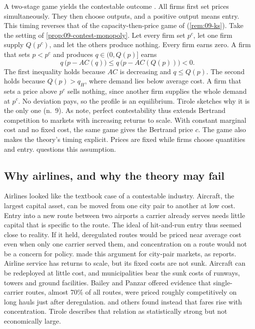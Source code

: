 \begin{remark}\label{rem:09-bertrand}
A two-stage game yields the contestable outcome \citep[sec.~8.1.2]{Tirole1988}. All firms first set prices
simultaneously. They then choose outputs, and a positive output means entry. This timing reverses that of
the capacity-then-price game of \citet{KrepsScheinkman1983} (\cref{rem:09-ks}). Take the setting of
\cref{prop:09-contest-monopoly}. Let every firm set $p^c$, let one firm supply $Q(p^c)$, and let the others
produce nothing. Every firm earns zero. A firm that sets $p < p^c$ and produces $q \in (0, Q(p)]$ earns
\begin{equation*}
  q\,\big(p - AC(q)\big) \le q\,\big(p - AC(Q(p))\big) < 0 .
\end{equation*}
The first inequality holds because $AC$ is decreasing and $q \le Q(p)$. The second holds because
$Q(p) > q_H$, where demand lies below average cost. A firm that sets a price above $p^c$ sells nothing, since
another firm supplies the whole demand at $p^c$. No deviation pays, so the profile is an equilibrium. Tirole
sketches why it is the only one (n.~9). As \citeauthor{BaumolPanzarWillig1982} note, perfect contestability
thus extends Bertrand competition to markets with increasing returns to scale. With constant marginal cost
and no fixed cost, the same game gives the Bertrand price $c$. The game also makes the theory's timing
explicit. Prices are fixed while firms choose quantities and entry.  questions
this assumption.
\end{remark}

\subsection{Why airlines, and why the theory may fail}\label{sec:09-contest-fail}

Airlines looked like the textbook case of a contestable industry. Aircraft, the largest capital asset, can be
moved from one city pair to another at low cost. Entry into a new route between two airports a carrier already
serves needs little capital that is specific to the route. The ideal of hit-and-run entry thus seemed close to
reality. If it held, deregulated routes would be priced near average cost even when only one carrier served
them, and concentration on a route would not be a concern for policy. \citet{BaileyPanzar1981} made this
argument for city-pair markets, as \citet[sec.~8.1.2, n.~11]{Tirole1988} reports. Airline service has returns
to scale, but its fixed costs are not sunk. Aircraft can be redeployed at little cost, and municipalities bear
the sunk costs of runways, towers and ground facilities. Bailey and Panzar offered evidence that single-carrier
routes, almost 70\% of all routes, were priced roughly competitively on long hauls just after deregulation.
\citet{BaileyGrahamKaplan1985} and others found instead that fares rise with concentration. Tirole describes
that relation as statistically strong but not economically large.

